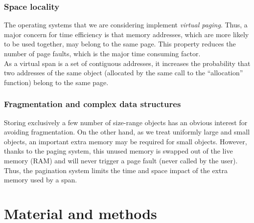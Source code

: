\documentclass[10pt]{article}											%
\begin{document}
\subsubsection{Space locality}
The operating systems that we are considering implement \emph{virtual paging}.   Thus, a major concern for time efficiency is that memory addresses, which are more likely to be used together, may belong to the same page.   This property reduces the number of page faults, which is the major time consuming factor.\\
As a virtual span is a set of contiguous addresses, it increases the probability that two addresses of the same object (allocated by the same call to the “allocation” function) belong to the same page.



\subsubsection{Fragmentation and complex data structures}
Storing exclusively a few number of size-range objects has an obvious interest for avoiding fragmentation.   On the other hand, as we treat uniformly large and small objects, an important extra memory may be required for small objects.   However, thanks to the paging system, this unused memory is swapped out of the live memory (RAM) and will never trigger a page fault (never called by the user).   Thus, the pagination system limits the time and space impact of the extra memory used by a span.











\section{Material and methods}
\end{document}
